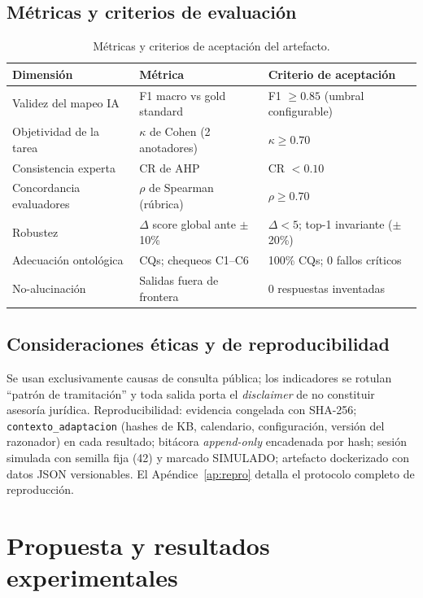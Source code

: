 \documentclass[a4paper,openany,12pt]{book}
\begin{document}
\section{Métricas y criterios de evaluación}
\begin{table}[H]\centering\footnotesize
\caption{Métricas y criterios de aceptación del artefacto.}\label{tab:criterios}
\begin{tabular}{p{4.2cm}p{4.6cm}p{4.6cm}}\toprule
\textbf{Dimensión} & \textbf{Métrica} & \textbf{Criterio de aceptación} \\ \midrule
Validez del mapeo IA & F1 macro vs gold standard & F1 $\ge 0.85$ (umbral configurable) \\
Objetividad de la tarea & $\kappa$ de Cohen (2 anotadores) & $\kappa \ge 0.70$ \\
Consistencia experta & CR de AHP & CR $< 0.10$ \\
Concordancia evaluadores & $\rho$ de Spearman (rúbrica) & $\rho \ge 0.70$ \\
Robustez & $\Delta$ score global ante $\pm$10\% & $\Delta < 5$; top-1 invariante ($\pm$20\%) \\
Adecuación ontológica & CQs; chequeos C1--C6 & 100\% CQs; 0 fallos críticos \\
No-alucinación & Salidas fuera de frontera & 0 respuestas inventadas \\ \bottomrule
\end{tabular}\end{table}

\section{Consideraciones éticas y de reproducibilidad}
Se usan exclusivamente causas de consulta pública; los indicadores se rotulan ``patrón de tramitación'' y toda salida porta el \textit{disclaimer} de no constituir asesoría jurídica. Reproducibilidad: evidencia congelada con SHA-256; \texttt{contexto\_adaptacion} (hashes de KB, calendario, configuración, versión del razonador) en cada resultado; bitácora \textit{append-only} encadenada por hash; sesión simulada con semilla fija (42) y marcado SIMULADO; artefacto dockerizado con datos JSON versionables. El Apéndice~\ref{ap:repro} detalla el protocolo completo de reproducción.

\chapter{Propuesta y resultados experimentales}
\end{document}
